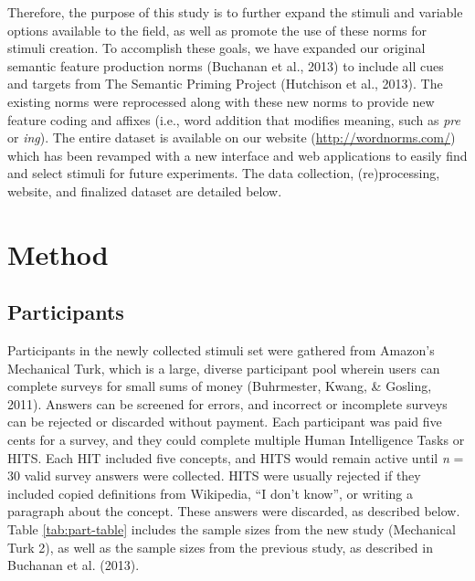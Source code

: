 \documentclass[english,,man]{apa6}
\theoremstyle{definition}
\theoremstyle{definition}
\theoremstyle{definition}
\theoremstyle{remark}
\begin{document}
Therefore, the purpose of this study is to further expand the stimuli
and variable options available to the field, as well as promote the use
of these norms for stimuli creation. To accomplish these goals, we have
expanded our original semantic feature production norms (Buchanan et
al., 2013) to include all cues and targets from The Semantic Priming
Project (Hutchison et al., 2013). The existing norms were reprocessed
along with these new norms to provide new feature coding and affixes
(i.e., word addition that modifies meaning, such as \emph{pre} or
\emph{ing}). The entire dataset is available on our website
(\url{http://wordnorms.com/}) which has been revamped with a new
interface and web applications to easily find and select stimuli for
future experiments. The data collection, (re)processing, website, and
finalized dataset are detailed below.

\hypertarget{method}{%
\section{Method}\label{method}}

\hypertarget{participants}{%
\subsection{Participants}\label{participants}}

Participants in the newly collected stimuli set were gathered from
Amazon's Mechanical Turk, which is a large, diverse participant pool
wherein users can complete surveys for small sums of money (Buhrmester,
Kwang, \& Gosling, 2011). Answers can be screened for errors, and
incorrect or incomplete surveys can be rejected or discarded without
payment. Each participant was paid five cents for a survey, and they
could complete multiple Human Intelligence Tasks or HITS. Each HIT
included five concepts, and HITS would remain active until \emph{n} = 30
valid survey answers were collected. HITS were usually rejected if they
included copied definitions from Wikipedia, \enquote{I don't know}, or
writing a paragraph about the concept. These answers were discarded, as
described below. Table \ref{tab:part-table} includes the sample sizes
from the new study (Mechanical Turk 2), as well as the sample sizes from
the previous study, as described in Buchanan et al. (2013).
\end{document}
